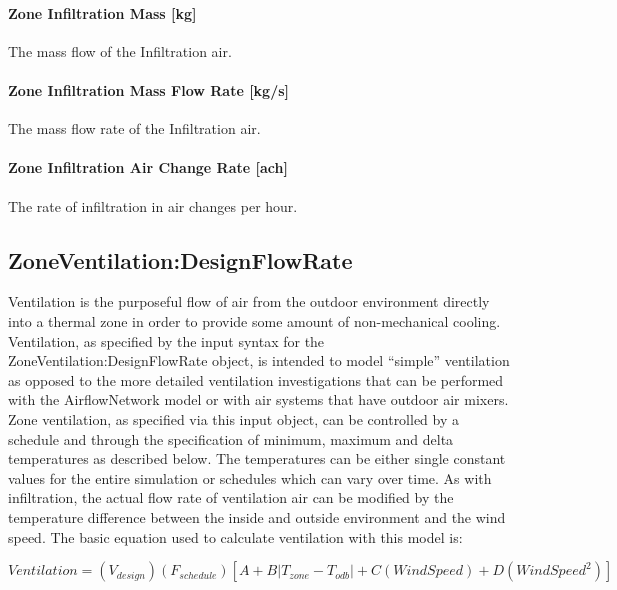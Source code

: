\paragraph{Zone Infiltration Mass {[}kg{]}}\label{zone-infiltration-mass-kg}

The mass flow of the Infiltration air.

\paragraph{Zone Infiltration Mass Flow Rate {[}kg/s{]}}\label{zone-infiltration-mass-flow-rate-kgs}

The mass flow rate of the Infiltration air.

\paragraph{Zone Infiltration Air Change Rate {[}ach{]}}\label{zone-infiltration-air-change-rate-ach}

The rate of infiltration in air changes per hour.

\subsection{ZoneVentilation:DesignFlowRate}\label{zoneventilationdesignflowrate}

Ventilation is the purposeful flow of air from the outdoor environment directly into a thermal zone in order to provide some amount of non-mechanical cooling. Ventilation, as specified by the input syntax for the ZoneVentilation:DesignFlowRate object, is intended to model ``simple'' ventilation as opposed to the more detailed ventilation investigations that can be performed with the AirflowNetwork model or with air systems that have outdoor air mixers. Zone ventilation, as specified via this input object, can be controlled by a schedule and through the specification of minimum, maximum and delta temperatures as described below. The temperatures can be either single constant values for the entire simulation or schedules which can vary over time. As with infiltration, the actual flow rate of ventilation air can be modified by the temperature difference between the inside and outside environment and the wind speed. The basic equation used to calculate ventilation with this model is:

\begin{equation}
Ventilation = \left( {{V_{design}}} \right)\left( {{F_{schedule}}} \right)\left[ {A + B\left| {{T_{zone}} - {T_{odb}}} \right| + C\left( {WindSpeed} \right) + D\left( {WindSpee{d^2}} \right)} \right]
\end{equation}

